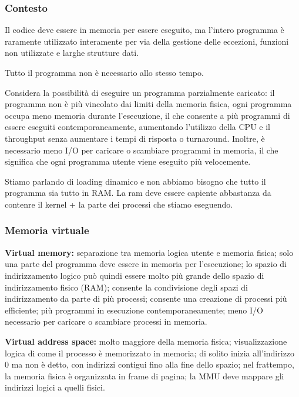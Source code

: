 \subsubsection{Contesto}

Il codice deve essere in memoria per essere eseguito,
ma l'intero programma è raramente utilizzato interamente per via della
gestione delle eccezioni, funzioni non utilizzate e larghe strutture dati.

Tutto il programma non è necessario allo stesso tempo.

Considera la possibilità di eseguire un programma parzialmente caricato:
il programma non è più vincolato dai limiti della memoria fisica, ogni programma
occupa meno memoria durante l'esecuzione, il che consente a più programmi di essere
eseguiti contemporaneamente, aumentando l'utilizzo della CPU e il throughput senza
aumentare i tempi di risposta o turnaround. Inoltre, è necessario meno I/O per
caricare o scambiare programmi in memoria, il che significa che ogni programma utente
viene eseguito più velocemente.\newline

Stiamo parlando di loading dinamico e non abbiamo bisogno che tutto il programma
sia tutto in RAM. La ram deve essere capiente abbastanza da contenre il kernel
+ la parte dei processi che stiamo eseguendo.

\subsubsection{Memoria virtuale}

\textbf{Virtual memory: } separazione tra memoria logica utente e memoria fisica;
solo una parte del programma deve essere in memoria per l'esecuzione; lo spazio
di indirizzamento logico può quindi essere molto più grande dello spazio di
indirizzamento fisico (RAM); consente la condivisione degli spazi di
indirizzamento da parte di più processi; consente una creazione di processi più
efficiente; più programmi in esecuzione contemporaneamente; meno I/O necessario
per caricare o scambiare processi in memoria.

\noindent\textbf{Virtual address space: } molto maggiore della memoria fisica;
visualizzazione logica di come il processo è memorizzato in memoria; di solito
inizia all'indirizzo 0 ma non è detto, con indirizzi contigui fino alla fine
dello spazio; nel frattempo, la memoria fisica è organizzata in frame di pagina;
la MMU deve mappare gli indirizzi logici a quelli fisici.

